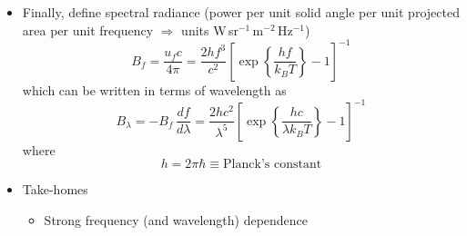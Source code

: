 \documentclass[11pt, oneside]{article}
\begin{document}
\begin{itemize}
	\item Finally, define spectral radiance (power per unit solid angle per unit projected area per unit frequency $\Rightarrow$ units W\,sr$^{-1}$\,m$^{-2}$\,Hz$^{-1}$)
	\begin{equation}
		\label{e:Bf}
		\boxed{B_f = \frac{u_fc}{4\pi} = \frac{2hf^3}{c^2}\left[\exp\left\{\frac{hf}{k_BT}\right\} - 1\right]^{-1}}
	\end{equation}
	which can be written in terms of wavelength as
	\begin{equation}
		\label{e:Bl}
		\boxed{B_\lambda = -B_f\,\frac{df}{d\lambda} = \frac{2hc^2}{\lambda^5}\left[\exp\left\{\frac{hc}{\lambda k_BT}\right\} - 1\right]^{-1}}
	\end{equation}
	where
	\begin{equation*}
		h = 2\pi\hbar \equiv \text{Planck's constant}
	\end{equation*}
	\item Take-homes
	\begin{itemize}
		\item[--] Strong frequency (and wavelength) dependence
		\begin{itemize}

\end{itemize}
\end{itemize}
\end{itemize}
\end{document}
